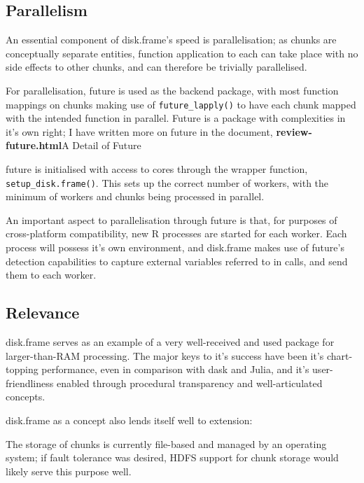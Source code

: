 \hypertarget{sec:parallelisation}{
    \subsection{Parallelism}\label{sec:parallelisation}}

An essential component of disk.frame's speed is parallelisation; as
chunks are conceptually separate entities, function application to each
can take place with no side effects to other chunks, and can therefore
be trivially parallelised.

For parallelisation, future is used as the backend package, with most
function mappings on chunks making use of \texttt{future_lapply()}
to have each chunk mapped with the intended function in parallel. Future
is a package with complexities in it's own right; I have written more on
future in the document, \textbf{review-future.html}{A Detail of Future}

future is initialised with access to cores through the wrapper function,
\texttt{setup_disk.frame()}\cite{zj19:_key}.
This sets up the correct number of workers, with the minimum of workers
and chunks being processed in parallel.

An important aspect to parallelisation through future is that, for
purposes of cross-platform compatibility, new R processes are started
for each worker\cite{zj19:_using}. Each process will possess it's own
environment, and disk.frame makes use of future's detection capabilities
to capture external variables referred to in calls, and send them to
each worker.

\hypertarget{sec:relevance}{%
    \subsection{Relevance}\label{sec:relevance}}

disk.frame serves as an example of a very well-received and used package
for larger-than-RAM processing. The major keys to it's success have been
it's chart-topping performance, even in comparison with dask and Julia,
and it's user-friendliness enabled through procedural transparency and
well-articulated concepts.

disk.frame as a concept also lends itself well to extension:

The storage of chunks is currently file-based and managed by an
operating system; if fault tolerance was desired, HDFS support for chunk
storage would likely serve this purpose well.

